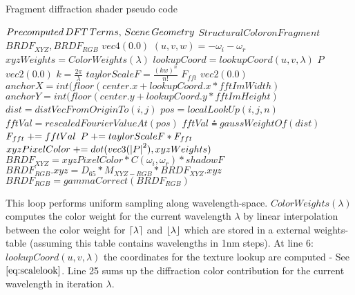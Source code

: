 \begin{algorithm}[H]
  \caption{Fragment diffraction shader pseudo code}
  \begin{algorithmic}[1]
    \INPUT $Precomputed \thinspace DFT \thinspace Terms,\thinspace Scene \thinspace Geometry$
    \MOUTPUT $Structural Color on Fragment$
      \State \init $BRDF_{XYZ}, BRDF_{RGB}$ \myto $vec4(0.0)$
      \State $(u,v,w) = -\omega_i - \omega_r$
        \State $xyzWeights = ColorWeights(\lambda)$
        \State $lookupCoord = lookupCoord(u, v, \lambda)$
        \State \init $P$ \myto $vec2(0.0)$
        \State $k = \frac{2\pi}{\lambda}$
          \State $taylorScaleF = \frac{(kw)^n}{n!}$
          \State \init $F_{fft}$  \myto $vec2(0.0)$
          \State $anchorX = int(floor(center.x + lookupCoord.x * fftImWidth)$
          \State $anchorY = int(floor(center.y + lookupCoord.y * fftImHeight)$
              \State $dist = distVecFromOriginTo(i,j)$
              \State $pos = localLookUp(i,j,n)$
              \State $fftVal = rescaledFourierValueAt(pos)$
              \State $fftVal \asteq gaussWeightOf(dist)$
              \State $F_{fft} \mathrel{+}= fftVal$
            \EndFor
          \EndFor
          \State $P \mathrel{+}= taylorScaleF*F_{fft}$
        \EndFor
        \State $xyzPixelColor \mathrel{+}= dot(vec3(\left|P\right|^2), xyzWeights)$
      \EndFor
      \State $BRDF_{XYZ} = xyzPixelColor*C(\omega_i, \omega_r)*shadowF$
      \State $BRDF_{RGB}.xyz = D_{65}*M_{XYZ-RGB}*BRDF_{XYZ}.xyz$
      \State $BRDF_{RGB}= gammaCorrect(BRDF_{RGB})$
    \EndFor
  \end{algorithmic}
  \label{alg:fragmentshaderall}
\end{algorithm}


This loop performs uniform sampling along wavelength-space. $ColorWeights(\lambda)$ computes the color weight for the current wavelength $\lambda$ by linear interpolation between the color weight for $\lceil\lambda\rceil$ and $\lfloor\lambda\rfloor$ which are stored in a external weights-table (assuming this table contains wavelengths in 1nm steps). At line 6: $lookupCoord(u, v, \lambda)$ the coordinates for the texture lookup are computed - See $\ref{eq:scalelook}$. Line 25 sums up the diffraction color contribution for the current wavelength in iteration $\lambda$.  

